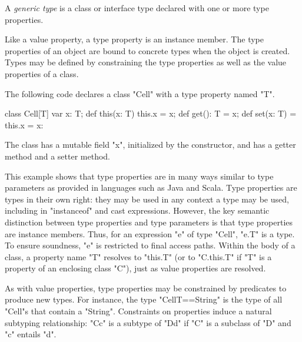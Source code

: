 A {\em generic type} is a class or interface type declared with
one or more type properties.

Like a value property, a type property is an instance member.
The type properties of an object are bound to concrete types
when the object is
created.
Types may be defined by constraining the type properties as
well as the value properties of a class.

The following code declares a class \xcd"Cell" with a type
property named \xcd"T".
\begin{xten}
class Cell[T] {
    var x: T;
    def this(x: T) { this.x = x; }
    def get(): T = x;
    def set(x: T) = { this.x = x: }
}
\end{xten}
The class has a mutable field \xcd"x", initialized by the
constructor, and has a getter method and a setter method.

This example shows that type properties are in many ways similar to
type parameters as provided in languages such as Java and Scala.
Type properties are types in their own right:
they may be used in any context a type may be used,
including in \xcd"instanceof" and cast expressions.
However, the key semantic distinction between type properties
and type parameters is that type properties are instance
members.
Thus, for an expression \xcd"e" of type \xcd"Cell", \xcd"e.T" is a type. 
To ensure
soundness, \xcd"e" is restricted to final access paths.
Within the body of a class, a property name \xcd"T" resolves
to \xcd"this.T" (or to \xcd"C.this.T" if \xcd"T" is a property of
an enclosing class \xcd"C"), just as value properties are
resolved.

As with value properties, type properties may be constrained
by predicates to produce new types.
For instance, the type \xcd"Cell{T==String}" is the type of
all \xcd"Cell"s that contain a \xcd"String".
Constraints on properties induce a natural subtyping relationship:
\xcd"C{c}" is a subtype of
\xcd"D{d}" if \xcd"C" is a subclass of \xcd"D" and
\xcd"c" entails \xcd"d".

